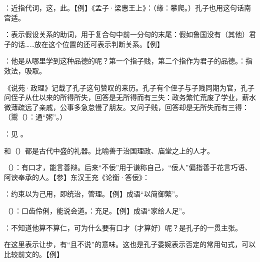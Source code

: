 {
\item {}：近指代词，这，此。【例】《孟子·梁惠王上》：（缘：攀爬。）孔子也用这句话南宫适。

\item {}：表示假设关系的助词，用于复合句中前一分句的末尾：假如鲁国没有（其他）君子的话……放在这个位置的还可表示判断关系。【例】   
\item {}：他是从哪里学到这种品德的呢？第一个指子贱，第二个指作为君子的品德。：指效法，吸取。

《说苑·政理》记载了孔子这句赞叹的来历。孔子有个侄子与子贱同期为官，孔子问侄子从仕以来的所得所失，回答是无所得而有三失：政务繁忙荒废了学业，薪水微薄疏远了亲戚，公事多急怠慢了朋友。又问子贱，回答却是无所失而有三得：（鬻（）：通“粥”。）
}
{}


{
\item {}：见  。
\item {}和（）都是古代中盛的礼器。比喻善于治国理政、庙堂之上的人才。
}
{}


{
\item {}（）：有口才，能言善辩。后来“不佞”用于谦称自己，“佞人”偏指善于花言巧语、阿谀奉承的人。【参】东汉王充《论衡·答佞》：
\item {}：约束以为己用，即统治，管理。【例】成语“以简御繁”。
\item {}（）：口齿伶俐，能说会道。：充足。【例】成语“家给人足”。
\item {}：不知道他算不算仁，可为什么要有口才（才算好）呢？是孔子的一贯主张。

在这里表示让步，有“且不说”的意味。这也是孔子委婉表示否定的常用句式，可以比较前文的。【例】  
}
{}


